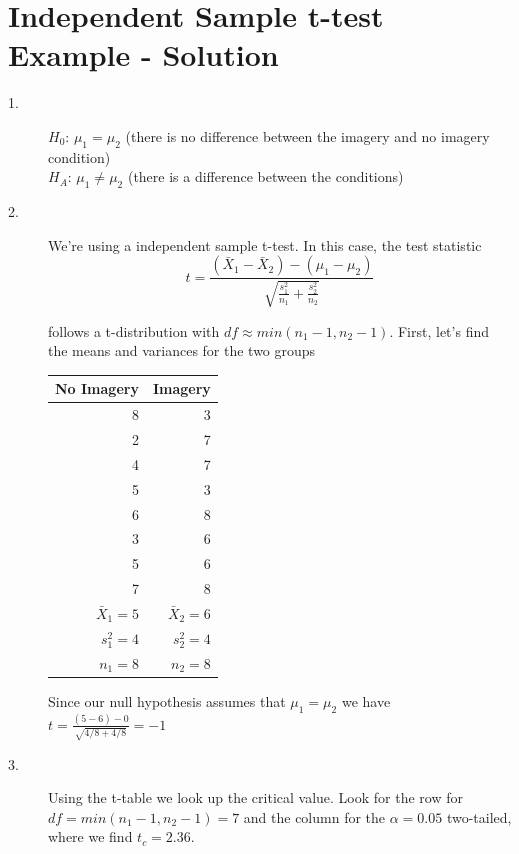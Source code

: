\documentclass{tufte-handout}
\begin{document}
\pagebreak

\section{Independent Sample t-test Example - Solution}

\begin{fullwidth}
\begin{description}
\item[1.] $H_0$: $\mu_1=\mu_2$ (there is no difference between the imagery and no imagery condition)\\
$H_A$: $\mu_1\neq \mu_2$ (there is a difference between the conditions)

\item[2.] We're using a independent sample t-test. In this case, the test statistic
\begin{equation*}
t=\frac{(\bar{X}_1-\bar{X}_2)-(\mu_1-\mu_2)}{\sqrt{\frac{s_1^2}{n_1} + \frac{s_2^2}{n_2}}}
\end{equation*}

follows a t-distribution with  $df \approx min(n_1-1,n_2-1)$. First, let's find the means and variances for the two groups

\begin{table}
  \centering
  \selectfont
  \begin{tabular}{rr}
    \toprule
No Imagery & Imagery\\
    \midrule
8&	3\\
2&	7\\
4&	7\\
5&	3\\
6&	8\\
3&	6\\
5&	6\\
7&	8\\
    \bottomrule
$\bar{X}_1=5$& $\bar{X}_2=6$\\
$s_1^2=4$& $s_2^2=4$\\
$n_1=8$& $n_2=8$\\
    \bottomrule
  \end{tabular}
  \label{tab:normaltab}
\end{table}
\vspace{20pt}
Since our null hypothesis assumes that $\mu_1=\mu_2$ we have $t=\frac{(5-6)-0}{\sqrt{4/8+4/8}}=-1$

\item[3.] Using the t-table we look up the critical value. Look for the row for $df=min(n_1-1,n_2-1)=7$ and the column for the $\alpha=0.05$ two-tailed, where we find $t_c=2.36$.


\end{description}
\end{fullwidth}
\end{document}
